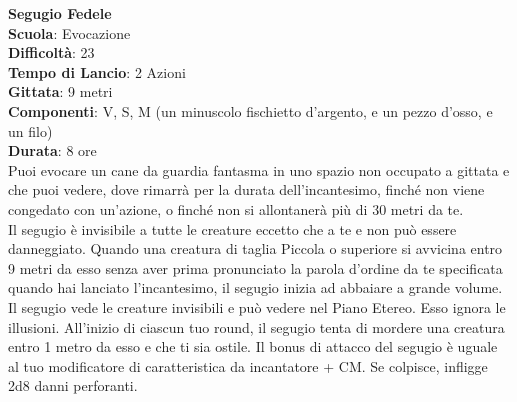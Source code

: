 \begin{multicols}{2}
\medskip\textbf{Segugio Fedele}\\
\textbf{Scuola}: Evocazione\\
\textbf{Difficoltà}: 23\\
\textbf{Tempo di Lancio}: 2 Azioni\\
\textbf{Gittata}: 9 metri\\
\textbf{Componenti}: V, S, M (un minuscolo fischietto d'argento, e un pezzo d'osso, e un filo)\\
\textbf{Durata}: 8 ore\\
Puoi evocare un cane da guardia fantasma in uno spazio non occupato a gittata e che puoi vedere, dove rimarrà per la durata dell'incantesimo, finché non viene congedato con un'azione, o finché non si allontanerà più di 30 metri da te.\\
Il segugio è invisibile a tutte le creature eccetto che a te e non può essere danneggiato. Quando una creatura di taglia Piccola o superiore si avvicina entro 9 metri da esso senza aver prima pronunciato la parola d'ordine da te specificata quando hai lanciato l'incantesimo, il segugio inizia ad abbaiare a grande volume. Il segugio vede le creature invisibili e può vedere nel Piano Etereo. Esso ignora le illusioni. All'inizio di ciascun tuo round, il segugio tenta di mordere una creatura entro 1 metro da esso e che ti sia ostile. Il bonus di attacco del segugio è uguale al tuo modificatore di caratteristica da incantatore + CM. Se colpisce, infligge 2d8 danni perforanti.


\end{multicols}
